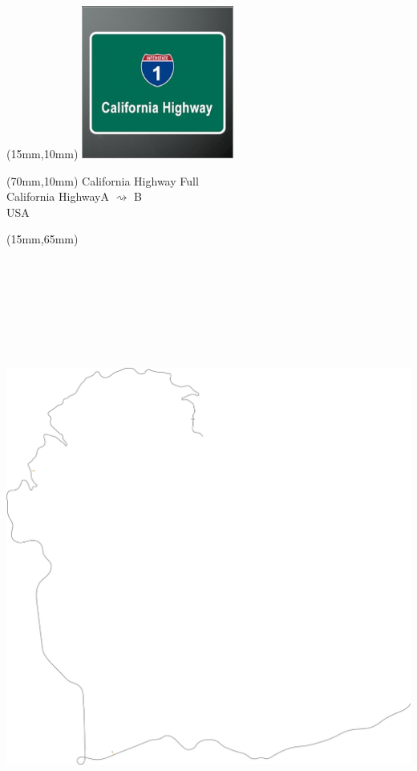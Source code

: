 \null\newpage
\begin{textblock*}{50mm}(15mm,10mm)%
\includegraphics[width=50mm]{LG/2015-05-20_00077.png}
\end{textblock*}
\begin{textblock*}{130mm}(70mm,10mm)%
{\fontsize{20}{20}\selectfont California Highway Full\\}
{\fontsize{16}{16}\selectfont California Highway\hfill A $\rightsquigarrow$ B\\}
{\fontsize{12}{12}\selectfont USA\\}
\end{textblock*}
\begin{textblock*}{185mm}(15mm,65mm)%
\centering
\mbox{\includegraphics[width=185mm,height=210mm,keepaspectratio]{PT/CAHIFU.pdf}}
\end{textblock*}
